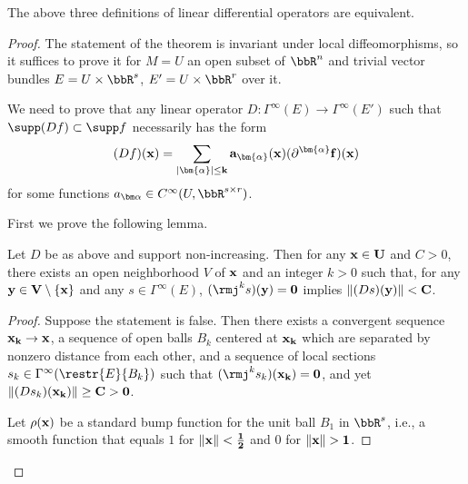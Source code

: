 \begin{thm}
    The above three definitions of linear differential operators are equivalent.
\end{thm}
\begin{proof}
    The statement of the theorem is invariant under local diffeomorphisms, so it suffices to prove it for $M=U$ an open subset of $\bbR^n$ and trivial vector bundles $E=U\times\bbR^s$, $E'=U\times\bbR^r$ over it.

    We need to prove that any linear operator $D:\Gamma^\infty(E)\to \Gamma^\infty(E')$ such that $\supp (Df)\subset \supp f$ necessarily has the form 
    \[(Df)(\bf{x})=\sum_{|\bm{\alpha}|\leq k}a_{\bm{\alpha}}(\bf{x})(\partial^{\bm{\alpha}}f)(\bf{x})\]
    for some functions $a_{\bm\alpha}\in C^\infty(U,\bbR^{s\times r})$.

    First we prove the following lemma.
    \begin{lem}
        Let $D$ be as above and support non-increasing. Then for any $\bf{x}\in U$ and $C>0$, there exists an open neighborhood $V$ of $\bf{x}$ and an integer $k>0$ such that, for any $\bf{y}\in V\setminus\{\bf{x}\}$ and any $s\in\Gamma^\infty(E)$, $(\rmj^ks)(\bf{y})=0$ implies $\lVert (Ds)(\bf{y})\rVert<C$.
    \end{lem}
    \begin{proof}
        Suppose the statement is false. Then there exists a convergent sequence $\bf{x}_k\to \bf{x}$, a sequence of open balls $B_k$ centered at $\bf{x}_k$ which are separated by nonzero distance from each other, and a sequence of local sections $s_k\in\Gamma^\infty(\restr{E}{B_k})$ such that $(\rmj^ks_k)(\bf{x}_k)=0$, and yet $\lVert(Ds_k)(\bf{x}_k)\rVert\geq C>0$.

        Let $\rho(\bf{x})$ be a standard bump function for the unit ball $B_1$ in $\bbR^s$, i.e., a smooth function that equals $1$ for $\lVert\bf{x}\rVert<\frac12$ and $0$ for $\lVert\bf{x}\rVert>1$.


\end{proof}
\end{proof}

